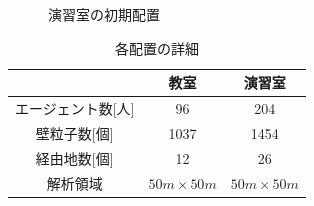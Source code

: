 \begin{figure}[tb]
\begin{minipage}[b]{0.5\columnwidth}
		\caption{演習室の初期配置}
    \label{fig:pc_haichi}
	\end{minipage}
\end{figure}



\begin{table}[tb]
  \begin{center}
    \caption{各配置の詳細}
    \label{tb:haichi_para}
    \begin{tabular}{c|c|c}
      \hline \hline
      & 教室 & 演習室 \\ \hline 
      エージェント数[人] & 96 & 204 \\ \hline
      壁粒子数[個] & 1037 & 1454\\ \hline
      経由地数[個] & 12   & 26 \\ \hline
      解析領域 & $50m\times50m$ & $50m\times50m$ \\ \hline
    \end{tabular}
  \end{center}
\end{table}


